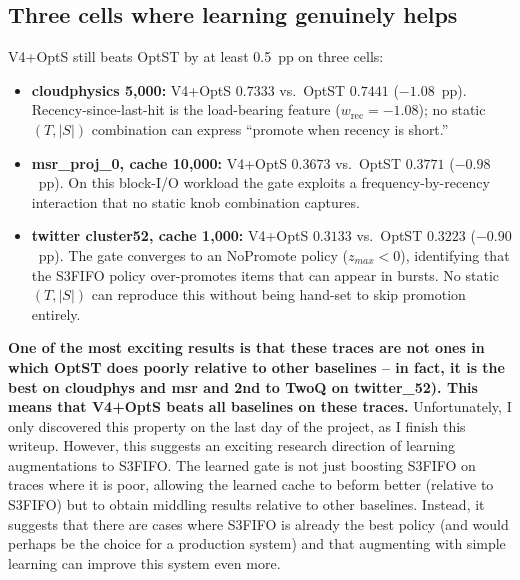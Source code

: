 \documentclass[letterpaper,twocolumn,10pt]{article}
\begin{document}
\subsection{Three cells where learning genuinely helps}
 
V4+OptS still beats OptST by at least 0.5~pp on three cells:
\begin{itemize}
  \item \textbf{cloudphysics 5{,}000:} V4+OptS $0.7333$ vs.\ OptST $0.7441$ ($-1.08$~pp). Recency-since-last-hit is the load-bearing feature ($w_{\textrm{rec}} = -1.08$); no static $(T, |S|)$ combination can express ``promote when recency is short.''
  \item \textbf{msr\_proj\_0, cache 10{,}000:} V4+OptS $0.3673$ vs.\ OptST $0.3771$ ($-0.98$~pp). On this block-I/O workload the gate exploits a frequency-by-recency interaction that no static knob combination captures.
  \item \textbf{twitter cluster52, cache 1{,}000:} V4+OptS $0.3133$ vs.\ OptST $0.3223$ ($-0.90$~pp). The gate converges to an NoPromote policy ($z_{max} < 0$), identifying that the S3FIFO policy over-promotes items that can appear in bursts. No static $(T, |S|)$ can reproduce this without being hand-set to skip promotion entirely.
\end{itemize}

\textbf{One of the most exciting results is that these traces are not ones in which OptST does poorly relative to other baselines -- in fact, it is the best on cloudphys and msr and 2nd to TwoQ on twitter\_52). This means that V4+OptS beats all baselines on these traces.} Unfortunately, I only discovered this property on the last day of the project, as I finish this writeup. However, this suggests an exciting research direction of learning augmentations to S3FIFO. The learned gate is not just boosting S3FIFO on traces where it is poor, allowing the learned cache to beform better (relative to S3FIFO) but to obtain middling results relative to other baselines. Instead, it suggests that there are cases where S3FIFO is already the best policy (and would perhaps be the choice for a production system) and that augmenting with simple learning can improve this system even more. 
 
\end{document}
